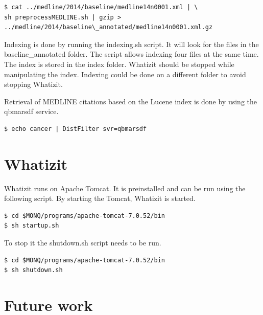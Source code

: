\documentclass{report}
\begin{document}
\begin{verbatim}
$ cat ../medline/2014/baseline/medline14n0001.xml | \
sh preprocessMEDLINE.sh | gzip > 
../medline/2014/baseline\_annotated/medline14n0001.xml.gz
\end{verbatim}

Indexing is done by running the indexing.sh script.
It will look for the files in the baseline\_annotated folder.
The script allows indexing four files at the same time.
The index is stored in the index folder.
Whatizit should be stopped while manipulating the index.
Indexing could be done on a different folder to avoid stopping Whatizit.

Retrieval of MEDLINE citations based on the Lucene index is done by using the qbmarsdf service.

\begin{verbatim}
$ echo cancer | DistFilter svr=qbmarsdf
\end{verbatim}

\section{Whatizit}

Whatizit runs on Apache Tomcat. It is preinstalled and can be run using the following script.
By starting the Tomcat, Whatizit is started.

\begin{verbatim}
$ cd $MONQ/programs/apache-tomcat-7.0.52/bin
$ sh startup.sh
\end{verbatim}

To stop it the shutdown.sh script needs to be run.

\begin{verbatim}
$ cd $MONQ/programs/apache-tomcat-7.0.52/bin
$ sh shutdown.sh
\end{verbatim}


\section{Future work}
\end{document}
